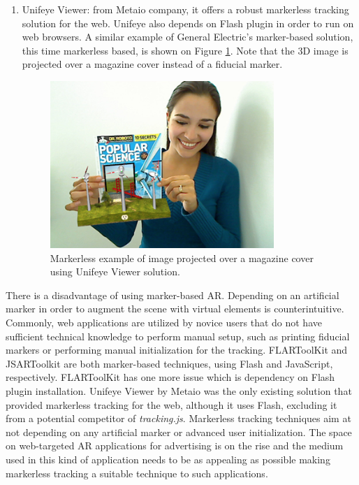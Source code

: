 \begin{enumerate}
    \item Unifeye Viewer: from Metaio company, it offers a robust markerless tracking solution for the web. Unifeye \cite{Metaio2009} also depends on Flash plugin in order to run on web browsers. A similar example of General Electric's marker-based solution, this time markerless based, is shown on Figure \ref{figure:unifeyeviewer}. Note that the 3D image is projected over a magazine cover instead of a fiducial marker.

    \begin{figure}[!htb]
      \centering
      \includegraphics[width=240pt]{chapters/tracking_library_for_the_web/unifeyeviewer.png}
      \caption{Markerless example of image projected over a magazine cover using Unifeye Viewer solution.}
      \label{figure:unifeyeviewer}
    \end{figure}
\end{enumerate}

There is a disadvantage of using marker-based AR. Depending on an artificial marker in order to augment the scene with virtual elements is counterintuitive. Commonly, web applications are utilized by novice users that do not have sufficient technical knowledge to perform manual setup, such as printing fiducial markers or performing manual initialization for the tracking. FLARToolKit and JSARToolkit are both marker-based techniques, using Flash and JavaScript, respectively. FLARToolKit has one more issue which is dependency on Flash plugin installation. Unifeye Viewer by Metaio was the only existing solution that provided markerless tracking for the web, although it uses Flash, excluding it from a potential competitor of \textit{tracking.js}. Markerless tracking techniques aim at not depending on any artificial marker or advanced user initialization. The space on web-targeted AR applications for advertising is on the rise and the medium used in this kind of application needs to be as appealing as possible \cite{Pablo2013} making markerless tracking a suitable technique to such applications.

